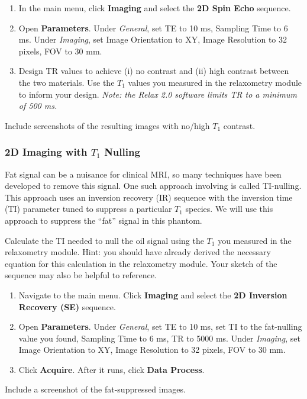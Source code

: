 \begin{enumerate}
    \item   In the main menu, click \textbf{Imaging} and select the \textbf{2D Spin Echo} sequence.
    \item   Open \textbf{Parameters}. Under \emph{General}, set TE to 10 ms, Sampling Time to 6 ms. Under \emph{Imaging}, set Image Orientation to XY, Image Resolution to 32 pixels, FOV to 30 mm.
    \item   Design TR values to achieve (i) no contrast and (ii) high contrast between the two materials. Use the $T_1$ values you measured in the relaxometry module to inform your design. \emph{Note: the Relax 2.0 software limits TR to a minimum of 500 ms.}
 \end{enumerate}

 \color{red} \noindent
 Include screenshots of the resulting images with no/high $T_1$ contrast.
 \color{black}

\subsubsection{2D Imaging with $T_1$ Nulling} \label{sec:2d-T1}

Fat signal can be a nuisance for clinical MRI, so many techniques have been developed to remove this signal. One such approach involving is called TI-nulling. This approach uses an inversion recovery (IR) sequence with the inversion time (TI) parameter tuned to suppress a particular $T_1$ species. We will use this approach to suppress the ``fat'' signal in this phantom.

\color{red}
Calculate the TI needed to null the oil signal using the $T_1$ you measured in the relaxometry module. Hint: you should have already derived the necessary equation for this calculation in the relaxometry module. Your sketch of the sequence may also be helpful to reference.
\color{black}

\begin{enumerate}
    \item   Navigate to the main menu. Click \textbf{Imaging} and select the \textbf{2D Inversion Recovery (SE)} sequence.
    \item   Open \textbf{Parameters}. Under \emph{General}, set TE to 10 ms, set TI to the fat-nulling value you found, Sampling Time to 6 ms, TR to 5000 ms. Under \emph{Imaging}, set Image Orientation to XY, Image Resolution to 32 pixels, FOV to 30 mm.
    \item   Click \textbf{Acquire}. After it runs, click \textbf{Data Process}.
 \end{enumerate}

\noindent{}\color{red}
Include a screenshot of the fat-suppressed images.
\color{black}


